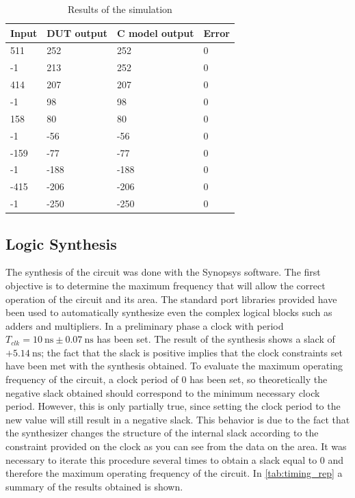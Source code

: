 \begin{table}[h]
\begin{center}
\begin{tabular}{|l|l|l|l|}
\hline
Input & DUT output & C model output & Error \\
\hline
511 & 252 & 252 & 0 \\
-1 & 213 & 252 & 0 \\
414 & 207 & 207 & 0 \\
-1 & 98 & 98 & 0 \\
158 & 80 & 80 & 0 \\
-1 & -56 & -56 & 0 \\
-159 & -77 & -77 & 0 \\
-1 & -188 & -188 & 0 \\
-415 & -206 & -206 & 0 \\
-1 & -250 & -250 & 0 \\
\hline
\end{tabular}
\end{center}
\caption{Results of the simulation}
\label{tab:tab_results}
\end{table}


\subsection{Logic Synthesis}
The synthesis of the circuit was done with the Synopsys software. The first objective is to determine the maximum frequency that will allow the correct operation of the circuit and its area. The standard port libraries provided have been used to automatically synthesize even the complex logical blocks such as adders and multipliers.
In a preliminary phase a clock with period $T_{clk} = \SI{10}{\nano\second} \pm \SI{0.07}{\nano\second}$ has been set. The result of the synthesis shows a slack of $+\SI{5.14}{\nano\second}$; the fact that the slack is positive implies that the clock constraints set have been met with the synthesis obtained.
To evaluate the maximum operating frequency of the circuit, a clock period of 0 has been set, so theoretically the negative slack obtained should correspond to the minimum necessary clock period. However, this is only partially true, since setting the clock period to the new value will still result in a negative slack. This behavior is due to the fact that the synthesizer changes the structure of the internal slack according to the constraint provided on the clock as you can see from the data on the area. It was necessary to iterate this procedure several times to obtain a slack equal to 0 and therefore the maximum operating frequency of the circuit. In \autoref{tab:timing_rep} a summary of the results obtained is shown.

